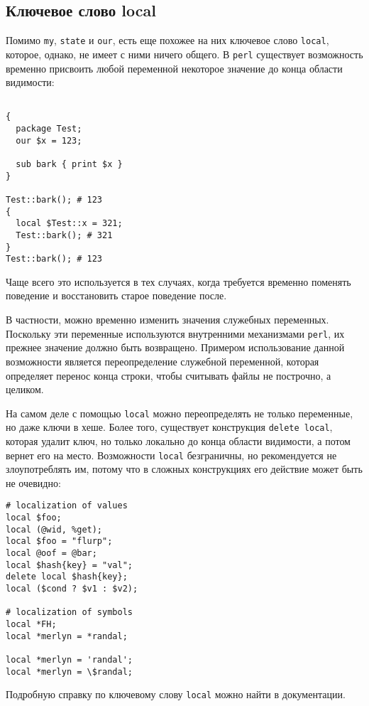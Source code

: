 \subsection{Ключевое слово local} %
Помимо \verb|my|, \verb|state| и \verb|our|, есть еще похожее на них ключевое слово \verb|local|, которое, однако, не имеет с ними ничего общего. В \verb|perl| существует возможность временно присвоить любой переменной некоторое значение до конца области видимости:
\begin{verbatim}

{
  package Test;
  our $x = 123;

  sub bark { print $x }
}

Test::bark(); # 123
{
  local $Test::x = 321;
  Test::bark(); # 321
}
Test::bark(); # 123
\end{verbatim}
Чаще всего это используется в тех случаях, когда требуется временно поменять поведение и восстановить старое поведение после.

В частности, можно временно изменить значения служебных переменных. Поскольку эти переменные используются внутренними механизмами \verb|perl|, их прежнее значение должно быть возвращено. Примером использование данной возможности является переопределение служебной переменной, которая определяет перенос конца строки, чтобы считывать файлы не построчно, а целиком.

На самом деле с помощью \verb|local| можно переопределять не только переменные, но даже ключи в хеше. Более того, существует конструкция \verb|delete local|, которая удалит ключ, но только локально до конца области видимости, а потом вернет его на место. Возможности \verb|local| безграничны, но рекомендуется не злоупотреблять им, потому что в сложных конструкциях его действие может быть не очевидно:
\begin{verbatim}
# localization of values
local $foo;
local (@wid, %get);
local $foo = "flurp";
local @oof = @bar;
local $hash{key} = "val";
delete local $hash{key};
local ($cond ? $v1 : $v2);

# localization of symbols
local *FH;
local *merlyn = *randal;

local *merlyn = 'randal';
local *merlyn = \$randal;
\end{verbatim}
Подробную справку по ключевому слову \verb|local| можно найти в документации.
